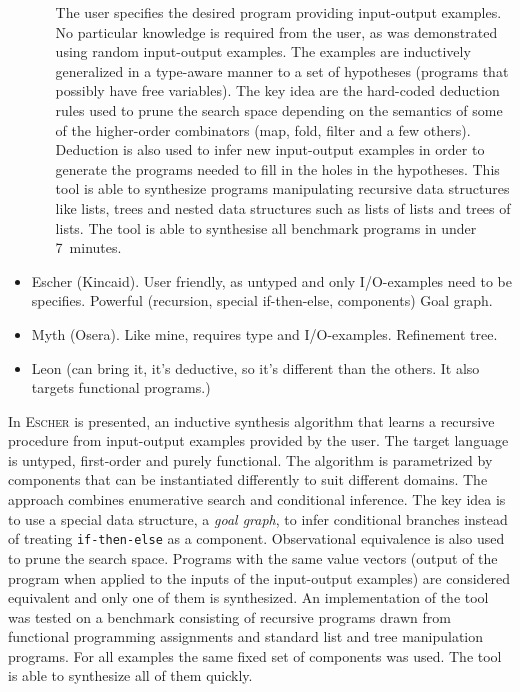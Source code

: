 \begin{itemize}
\begin{enumerate}
The user specifies the desired program providing input-output examples.  
No particular knowledge is required from the user, as was demonstrated using random input-output examples.
The examples are inductively generalized in a type-aware manner to a set of hypotheses (programs that possibly have free variables).
The key idea are the hard-coded deduction rules used to prune the search space depending on the semantics of some of the higher-order combinators (map, fold, filter and a few others).
Deduction is also used to infer new input-output examples in order to generate the programs needed to fill in the holes in the hypotheses.
This tool is able to synthesize programs manipulating recursive data structures like lists, trees and nested data structures such as lists of lists and trees of lists.
The tool is able to synthesise all benchmark programs in under 7~minutes.
\end{enumerate}
\item Escher (Kincaid). User friendly, as untyped and only I/O-examples need to be specifies. Powerful (recursion, special if-then-else, components) Goal graph.
\item Myth (Osera). Like mine, requires type and I/O-examples. Refinement tree.
\item Leon (can bring it, it's deductive, so it's different than the others. It also targets functional programs.)
\end{itemize}


In \cite{Albarghouthi:2013:RPS:2526861.2526942} \textsc{Escher} is presented, an inductive synthesis algorithm that learns a recursive procedure from input-output examples provided by the user.  The target language is untyped, first-order and purely functional.
The algorithm is parametrized by components that can be instantiated differently to suit different domains.
The approach combines enumerative search and conditional inference. The key idea is to use a special data structure, a \emph{goal graph}, to infer conditional branches instead of treating \texttt{if-then-else} as a component.
Observational equivalence is also used to prune the search space. Programs with the same value vectors (output of the program when applied to the inputs of the input-output examples) are considered equivalent and only one of them is synthesized.
An implementation of the tool was tested on a benchmark consisting of recursive programs  drawn from functional programming assignments and standard list and tree manipulation programs.
For all examples the same fixed set of components was used.
The tool is able to synthesize all of them quickly. 

